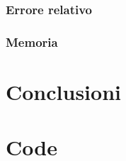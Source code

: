 \documentclass[11pt,italian]{article}
\begin{document}
\subsubsection*{Errore relativo}
\begin{figure}[H]
\end{figure}

\subsubsection*{Memoria}
\begin{figure}[H]
\end{figure}

\section{Conclusioni}
\section{Code}
\end{document}

